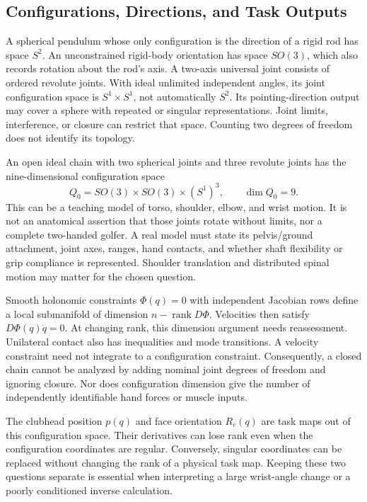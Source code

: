 \subsection{Configurations, Directions, and Task Outputs}

A spherical pendulum whose only configuration is the direction of a rigid rod
has space $S^2$. An unconstrained rigid-body orientation has space $SO(3)$,
which also records rotation about the rod's axis. A two-axis universal joint
consists of ordered revolute joints. With ideal unlimited independent angles,
its joint configuration space is $S^1\times S^1$, not automatically $S^2$.
Its pointing-direction output may cover a sphere with repeated or singular
representations. Joint limits, interference, or closure can restrict that
space. Counting two degrees of freedom does not identify its topology.

An open ideal chain with two spherical joints and three revolute joints has
the nine-dimensional configuration space
\begin{equation}\label{eq:golf_config}
 Q_0=SO(3)\times SO(3)\times(S^1)^3,\qquad \dim Q_0=9.
\end{equation}
This can be a teaching model of torso, shoulder, elbow, and wrist motion.
It is not an anatomical assertion that those joints rotate without limits,
nor a complete two-handed golfer. A real model must state its pelvis/ground
attachment, joint axes, ranges, hand contacts, and whether shaft flexibility
or grip compliance is represented. Shoulder translation and distributed
spinal motion may matter for the chosen question.

Smooth holonomic constraints $\Phi(q)=0$ with independent Jacobian rows define
a local submanifold of dimension $n-\operatorname{rank}D\Phi$. Velocities then
satisfy $D\Phi(q)\dot q=0$. At changing rank, this dimension argument needs
reassessment. Unilateral contact also has inequalities and mode transitions.
A velocity constraint need not integrate to a configuration constraint.
Consequently, a closed chain cannot be analyzed by adding nominal joint
degrees of freedom and ignoring closure. Nor does configuration dimension
give the number of independently identifiable hand forces or muscle inputs.

The clubhead position $p(q)$ and face orientation $R_c(q)$ are task maps out
of this configuration space. Their derivatives can lose rank even when the
configuration coordinates are regular. Conversely, singular coordinates can
be replaced without changing the rank of a physical task map. Keeping these
two questions separate is essential when interpreting a large wrist-angle
change or a poorly conditioned inverse calculation.

